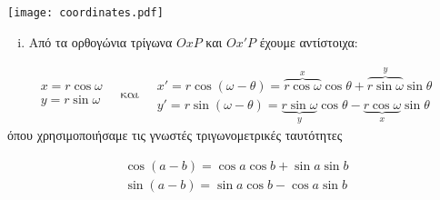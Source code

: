 \documentclass[a4paper,table]{report}
\newcommand{\twocolumnsidelcc}[2]{\begin{minipage}[c]{0.35\linewidth}\raggedright
        #1
        \end{minipage}\hfill\begin{minipage}[c]{0.60\linewidth}\raggedright
        #2
    \end{minipage}
}
\begin{document}
\begin{solution}
\item {}
  \twocolumnsidelcc{
    \texttt{[image: coordinates.pdf]}
  }{
    \begin{enumerate}[i)]
      \item Από τα ορθογώνια τρίγωνα $ OxP $ και $ Ox'P $ έχουμε αντίστοιχα:
    \end{enumerate}
    \[
      \begin{matrix}
        x = r \cos{\omega} \\
        y = r \sin{\omega}
      \end{matrix} 
      \quad \text{και} \quad 
      \begin{matrix}
        x' = r \cos{(\omega - \theta)} = \overbrace{r \cos{\omega}}^{x} \cos{\theta} +
        \overbrace{r \sin{\omega}}^{y}
        \sin{\theta} \\
        y' = r \sin{(\omega - \theta)} = \underbrace{r \sin{\omega}}_{y} \cos{\theta} -
        \underbrace{r \cos{\omega}}_{x}
        \sin{\theta}
      \end{matrix} 
    \]
    όπου χρησιμοποιήσαμε τις γνωστές τριγωνομετρικές ταυτότητες
    \begin{mybox1}
      \[
        \begin{aligned}
          \cos{(a-b)} = \cos{a} \cos{b} + \sin{a} \sin{b} \\
          \sin{(a-b)} = \sin{a} \cos{b} - \cos{a} \sin{b}
        \end{aligned}
      \]
    \end{mybox1}
  }


\end{solution}
\end{document}
